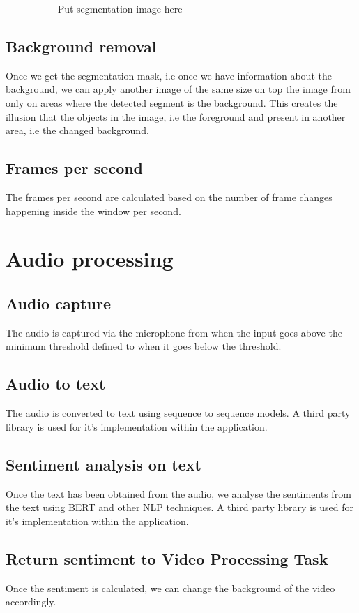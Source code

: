 ----------------Put segmentation image here------------------

\subsection{Background removal}
Once we get the segmentation mask, i.e once we have information about the background, we can apply another image of the same size on top the image from only on areas where the detected segment is the background. This creates the illusion that the objects in the image, i.e the foreground and present in another area, i.e the changed background.

\subsection{Frames per second}
The frames per second are calculated based on the number of frame changes happening inside the window per second.

\section{Audio processing}
\subsection{Audio capture}
The audio is captured via the microphone from when the input goes above the minimum threshold defined to when it goes below the threshold.

\subsection{Audio to text}
The audio is converted to text using sequence to sequence models. A third party library is used for it's implementation within the application.

\subsection{Sentiment analysis on text}
Once the text has been obtained from the audio, we analyse the sentiments from the text using BERT and other NLP techniques. A third party library is used for it's implementation within the application.

\subsection{Return sentiment to Video Processing Task}
Once the sentiment is calculated, we can change the background of the video accordingly.



